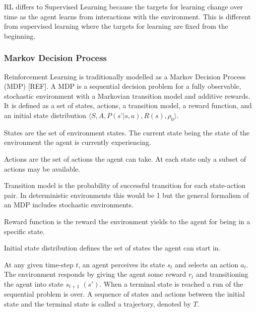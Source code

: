 \documentclass[10pt,journal,compsoc]{IEEEtran}
\begin{document}
RL differs to Supervised Learning because the targets for learning change over time as the agent learns from interactions with the environment. This is different from supervised learning where the targets for learning are fixed from the beginning.

\subsubsection{Markov Decision Process}
Reinforcement Learning is traditionally modelled as a Markov Decision Process (MDP) [REF]. A MDP is a sequential decision problem for a fully observable, stochastic environment with a Markovian transition model and additive rewards. It is defined as a set of states, actions, a transition model, a reward function, and an initial state distribution \begin{math}\langle S,A,P(s’|s,a),R(s),\rho_0 \rangle\end{math}. 

\begin{description}
\item[$S$] States are the set of environment states. The current state being the state of the environment the agent is currently experiencing.
\item[$A$] Actions are the set of actions the agent can take. At each state only a subset of actions may be available.
\item[$P(s'|s,a)$] Transition model is the probability of successful transition for each state-action pair. In deterministic environments this would be 1 but the general formalism of an MDP includes stochastic environments.
\item[$R(s)$] Reward function is the reward the environment yields to the agent for being in a specific state.
\item[$\rho_0$] Initial state distribution defines the set of states the agent can start in.
\end{description}


At any given time-step  \begin{math}t\end{math}, an agent perceives its state  \begin{math}s_t\end{math} and selects an action \begin{math}a_t\end{math}. The environment responds by giving the agent some reward  \begin{math}r_t\end{math} and transitioning the agent into state  \begin{math}s_{t+1}\end{math} \begin{math}(s')\end{math}. When a terminal state is reached a run of the sequential problem is over. A sequence of states and actions between the initial state and the terminal state is called a trajectory, denoted by  \begin{math}T\end{math}.
\end{document}
